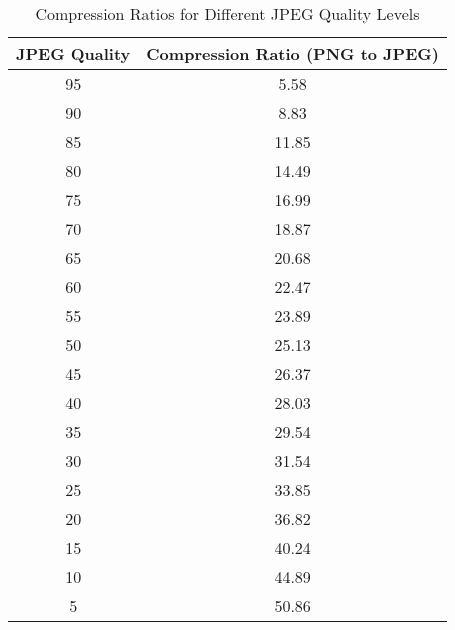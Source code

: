 \documentclass[a4paper,10pt]{article}
\begin{document}
\begin{table}[h!]
\centering
\begin{tabular}{|c|c|}
\hline
\textbf{JPEG Quality} & \textbf{Compression Ratio (PNG to JPEG)} \\
\hline
95 & 5.58 \\
90 & 8.83 \\
85 & 11.85 \\
80 & 14.49 \\
75 & 16.99 \\
70 & 18.87 \\
65 & 20.68 \\
60 & 22.47 \\
55 & 23.89 \\
50 & 25.13 \\
45 & 26.37 \\
40 & 28.03 \\
35 & 29.54 \\
30 & 31.54 \\
25 & 33.85 \\
20 & 36.82 \\
15 & 40.24 \\
10 & 44.89 \\
5 & 50.86 \\
\hline
\end{tabular}
\caption{Compression Ratios for Different JPEG Quality Levels}
\label{tab:compression_ratios}
\end{table}
\end{document}
